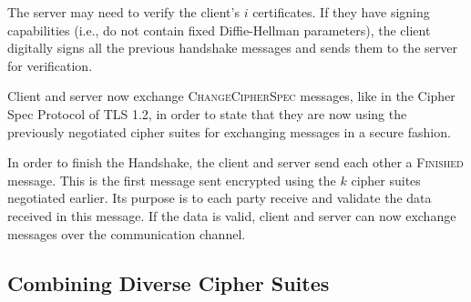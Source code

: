 \documentclass{sig-alternate-05-2015}
\newcommand{\msg}[1]{\textsc{{#1}}}
\begin{document}
The server may need to verify the client's $i$ certificates. If they have signing capabilities (i.e., do not contain fixed Diffie-Hellman parameters), the client digitally signs all the previous handshake messages and sends them to the server for verification.

Client and server now exchange \msg{ChangeCipherSpec} messages, like in the Cipher Spec Protocol of TLS 1.2, in order to state that they are now using the previously negotiated cipher suites for exchanging messages in a secure fashion.

In order to finish the Handshake, the client and server send each other a \msg{Finished} message. This is the first message sent encrypted using the $k$ cipher suites negotiated earlier. Its purpose is to each party receive and validate the data received in this message. If the data is valid, client and server can now exchange messages over the communication channel.

\subsection{Combining Diverse Cipher Suites}

\end{document}
